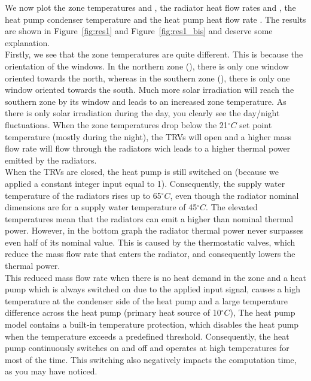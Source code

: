 \documentclass[10pt,a4paper]{article}
\begin{document}
We now plot the zone temperatures  and , the radiator heat flow rates  and , the heat pump condenser temperature  and the heat pump heat flow rate . The results are shown in Figure~\ref{fig:res1} and Figure~\ref{fig:res1_bis} and deserve some explanation.\\

Firstly, we see that the zone temperatures are quite different. This is because the orientation of the windows. In the northern zone (), there is only one window oriented towards the north, whereas in the southern zone (), there is only one window oriented towards the south. Much more solar irradiation will reach the southern zone by its window and leads to an increased zone temperature. As there is only solar irradiation during the day, you clearly see the day/night fluctuations. When the zone temperatures drop below the 21$^{\circ}C$ set point temperature (mostly during the night), the TRVs will open and a higher mass flow rate will flow through the radiators wich leads to a higher thermal power emitted by the radiators.\\

When the TRVs are closed, the heat pump is still switched on (because we applied a constant integer input equal to 1). Consequently, the supply water temperature of the radiators rises up to 65$^{\circ}C$, even though the radiator nominal dimensions are for a supply water temperature of
45$^{\circ}C$. The elevated temperatures mean that the radiators can
emit a higher than nominal thermal power.
However, in the bottom graph the radiator thermal power never surpasses
even half of its nominal value.
This is caused by the thermostatic valves, which reduce the mass flow rate
that enters the radiator, and consequently lowers the thermal power. \\

This reduced mass flow rate when there is no heat demand in the zone and a heat pump which is always switched on due to the applied input signal, causes a high temperature at the condenser side of the heat pump and a large temperature difference across the heat pump (primary heat source of 10$^{\circ}C$),
The heat pump model contains a built-in temperature protection, which disables
the heat pump when the temperature exceeds a predefined threshold.
Consequently, the heat pump continuously switches on and off
and operates at high temperatures for most of the time.
This switching also negatively impacts the computation time, 
as you may have noticed.\\
\end{document}
